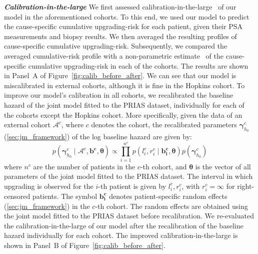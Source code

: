 \textbf{\textit{Calibration-in-the-large}}
We first assessed calibration-in-the-large~\citep{steyerberg2010assessing} of our model in the aforementioned cohorts. To this end, we used our model to predict the cause-specific cumulative upgrading-risk for each patient, given their PSA measurements and biopsy results. We then averaged the resulting profiles of cause-specific cumulative upgrading-risk. Subsequently, we compared the averaged cumulative-risk profile with a non-parametric estimate~\citep{turnbull1976empirical} of the cause-specific cumulative upgrading-risk in each of the cohorts. The results are shown in Panel~A of Figure~\ref{fig:calib_before_after}. We can see that our model is miscalibrated in external cohorts, although it is fine in the Hopkins cohort. To improve our model's calibration in all cohorts, we recalibrated the baseline hazard of the joint model fitted to the PRIAS dataset, individually for each of the cohorts except the Hopkins cohort. More specifically, given the data of an external cohort $\mathcal{A}^c$, where $c$ denotes the cohort, the recalibrated parameters $\boldsymbol{\gamma}_{h_0}^c$ (\ref{sec:jm_framework}) of the log baseline hazard are given by:
\begin{equation}
p(\boldsymbol{\gamma}_{h_0}^c \mid \mathcal{A}^c, \boldsymbol{b^c},  \boldsymbol{\theta}) \propto  \prod_{i=1}^{n^c} p(l_i^c, r_i^c \mid \boldsymbol{b^c_i}, \boldsymbol{\theta}) p(\boldsymbol{\gamma}_{h_0}^c)
\end{equation}
where $n^c$ are the number of patients in the $c$-th cohort, and $\boldsymbol{\theta}$ is the vector of all parameters of the joint model fitted to the PRIAS dataset. The interval in which upgrading is observed for the $i$-th patient is given by $l_i^c, r_i^c$, with $r_i^c = \infty$ for right-censored patients. The symbol $\boldsymbol{b^c_i}$ denotes patient-specific random effects (\ref{sec:jm_framework}) in the $c$-th cohort. The random effects are obtained using the joint model fitted to the PRIAS dataset before recalibration. We re-evaluated the calibration-in-the-large of our model after the recalibration of the baseline hazard individually for each cohort. The improved calibration-in-the-large is shown in Panel~B of Figure~\ref{fig:calib_before_after}.

